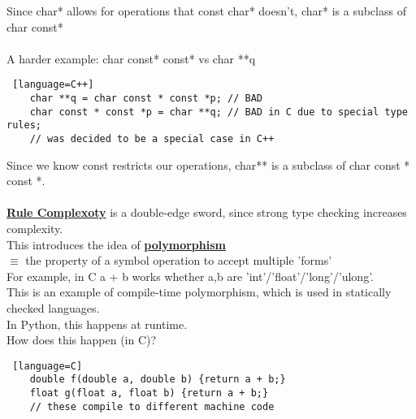 \documentclass[../../lecture_notes.tex]{subfiles}
\begin{document}
Since char* allows for operations that const char* doesn't, char* is a subclass of char const*\\
\\
A harder example: char const* const* vs char **q
\begin{lstlisting} [language=C++]
	char **q = char const * const *p; // BAD
	char const * const *p = char **q; // BAD in C due to special type rules; 
	// was decided to be a special case in C++
\end{lstlisting}
Since we know const restricts our operations, char** is a subclass of char const * const *.\\
\\
\textbf{\underline{Rule Complexoty}} is a double-edge sword, since strong type checking increases complexity.\\
This introduces the idea of \textbf{\underline{polymorphism}}\\
\indent $\equiv$ the property of a symbol operation to accept multiple 'forms'\\
For example, in C a + b works whether a,b are 'int'/'float'/'long'/'ulong'.\\
	\indent This is an example of compile-time polymorphism, which is used in statically checked languages.\\
In Python, this happens at runtime.\\
How does this happen (in C)?
\begin{lstlisting} [language=C]
	double f(double a, double b) {return a + b;}
	float g(float a, float b) {return a + b;}
	// these compile to different machine code
\end{lstlisting}
\end{document}
